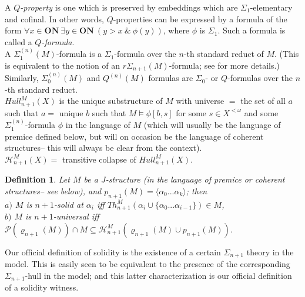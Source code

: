 \documentclass[12pt]{article}
\newtheorem{defn}[thm]{Definition}
\begin{document}
A \textit{$Q$-property} is one which is preserved by embeddings which are $\Sigma_1$-elementary and cofinal.  In other words, $Q$-properties can be expressed by a formula of the form $\forall x \in \textbf{ON} \ \exists y \in \textbf{ON} \ (y > x \  \& \ \phi (y))$, where $\phi$ is $\Sigma_1$.  Such a formula is called a \textit{$Q$-formula}.\\

A $\Sigma_1^{(n)} (M)$-formula is a $\Sigma_1$-formula over the $n$-th standard reduct of $M$.  (This is equivalent to the notion of an $r \Sigma_{n+1} (M)$-formula; see \cite{zeman book} for more details.)  Similarly, $\Sigma_0^{(n)} (M)$ and $Q^{(n)} (M)$ formulas are $\Sigma_0$- or $Q$-formulas over the $n$-th standard reduct.\\

$Hull_{n+1}^M (X)$ is the unique substructure of $M$ with universe $=$ the set of all $a$ such that $a =$ unique $b$ such that $M \models \phi [ b , s]$ for some $s \in X^{< \omega}$ and some $\Sigma_1^{(n)}$-formula $\phi$ in the language of $M$ (which will usually be the language of premice defined below, but will on occasion be the language of coherent structures-- this will always be clear from the context).\\

$\mathcal{H}_{n+1}^M (X) =$ transitive collapse of $Hull_{n+1}^M (X)$.\\

\begin{defn} \label{solidity}
Let $M$ be a $J$-structure (in the language of premice or coherent structures-- see below), and $p_{n+1} (M) = \langle \alpha_0 ... \alpha_k \rangle$; then\\

$a)$ $M$ is $n+1$-solid at $\alpha_i$ iff $Th_{n+1}^M (\alpha_i \cup \{ \alpha_0 ... \alpha_{i-1} \} ) \in M$,\\

$b)$ $M$ is $n+1$-universal iff $\mathcal{P} ( \varrho_{n+1} (M) ) \cap M \subseteq \mathcal{H}_{n+1}^M (\varrho_{n+1} (M) \cup p_{n+1} (M))$.
\end{defn}

Our official definition of solidity is the existence of a certain $\Sigma_{n+1}$ theory in the model.  This is easily seen to be equivalent to the presence of the corresponding $\Sigma_{n+1}$-hull in the model; and this latter characterization is our official definition of a solidity witness.\\
\end{document}
